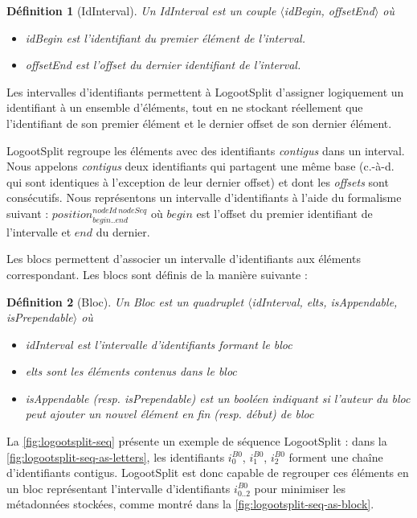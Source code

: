 \documentclass[12pt]{thesul}
\newtheorem{definition}{Définition}
\newcommand{\ie}{c.-à-d. }
\newcommand{\trm}[1]{\mathit{#1}}
\newcommand{\id}[3]{$\trm{#1}^{\trm{#2}}_{\trm{#3}}$}
\begin{document}
\begin{definition}[IdInterval]
  Un \emph{IdInterval} est un couple $\langle$idBegin, offsetEnd$\rangle$ où
  \begin{itemize}
    \item idBegin est l'identifiant du premier élément de l'interval.
    \item offsetEnd est l'offset du dernier identifiant de l'interval.
  \end{itemize}
\end{definition}

Les intervalles d'identifiants permettent à LogootSplit d'assigner logiquement un identifiant à un ensemble d'éléments, tout en ne stockant réellement que l'identifiant de son premier élément et le dernier offset de son dernier élément.

LogootSplit regroupe les éléments avec des identifiants \emph{contigus} dans un interval.
Nous appelons \emph{contigus} deux identifiants qui partagent une même base (\ie qui sont identiques à l'exception de leur dernier offset) et dont les \emph{offsets} sont consécutifs.
Nous représentons un intervalle d'identifiants à l'aide du formalisme suivant : \id{position}{nodeId~nodeSeq}{begin..end} où $\trm{begin}$ est l'offset du premier identifiant de l'intervalle et $\trm{end}$ du dernier.

Les blocs permettent d'associer un intervalle d'identifiants aux éléments correspondant.
Les blocs sont définis de la manière suivante :

\begin{definition}[Bloc]
  Un \emph{Bloc} est un quadruplet $\langle$idInterval, elts, isAppendable, isPrependable$\rangle$ où
  \begin{itemize}
    \item idInterval est l'intervalle d'identifiants formant le bloc
    \item elts sont les éléments contenus dans le bloc
    \item isAppendable (resp. isPrependable) est un booléen indiquant si l'auteur du bloc peut ajouter un nouvel élément en fin (resp. début) de bloc
  \end{itemize}
\end{definition}

La \autoref{fig:logootsplit-seq} présente un exemple de séquence LogootSplit : dans la \autoref{fig:logootsplit-seq-as-letters}, les identifiants \id{i}{B0}{0}, \id{i}{B0}{1}, \id{i}{B0}{2} forment une chaîne d'identifiants contigus.
LogootSplit est donc capable de regrouper ces éléments en un bloc représentant l'intervalle d'identifiants \id{i}{B0}{0..2} pour minimiser les métadonnées stockées, comme montré dans la \autoref{fig:logootsplit-seq-as-block}.
\end{document}
